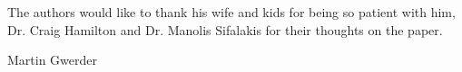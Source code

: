 \documentclass[12pt,journal,compsoc,peerreview]{IEEEtran}
\begin{document}
The authors would like to thank his wife and kids for being so patient with him, Dr. Craig Hamilton and Dr. Manolis Sifalakis for their thoughts on the paper.


\ifCLASSOPTIONcaptionsoff
  \newpage
\fi







%
%
%
%

% 
\ifCLASSOPTIONpeerreview
\else
\vfill
\begin{IEEEbiography}{Martin Gwerder}

\end{IEEEbiography}
\fi
\end{document}
